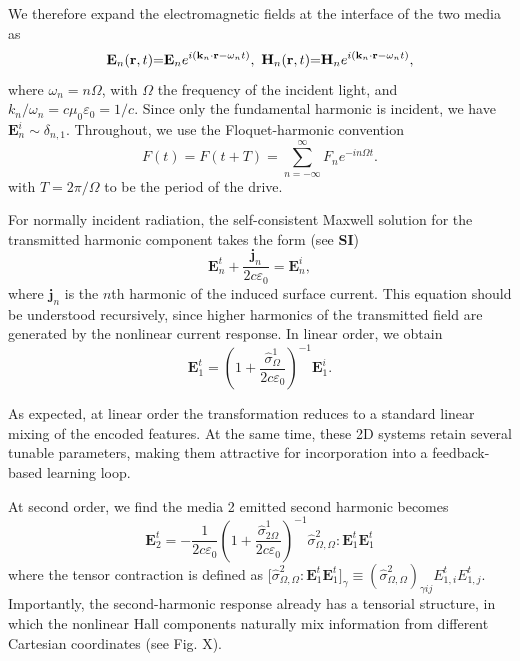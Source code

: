 \documentclass[twocolumn,aps,prb,superscriptaddress,longbibliography]{revtex4-2}
\renewcommand{\epsilon}{\varepsilon}
\begin{document}
We therefore expand the electromagnetic fields at the interface of the two media as
\begin{equation}
\mathbf E_n(\mathbf r,t)\hspace{-1mm}=\hspace{-1mm}\mathbf E_n e^{i(\mathbf k_n\cdot \mathbf r-\omega_n t)},~\mathbf H_n(\mathbf r,t)\hspace{-1mm}=\hspace{-1mm}\mathbf H_n e^{i(\mathbf k_n\cdot \mathbf r-\omega_n t)},
\end{equation}
where $\omega_n=n\Omega$, with $\Omega$ the frequency of the incident light, and $k_n/\omega_n = c\mu_0\varepsilon_0 = 1/c$. Since only the fundamental harmonic is incident, we have $\mathbf E_n^i \sim \delta_{n,1}$. Throughout, we use the Floquet-harmonic convention
\begin{equation}
F(t)=F(t+T)=\sum_{n=-\infty}^{\infty}F_n e^{-in\Omega t}.
\end{equation}
with $T = 2\pi/\Omega$ to be the period of the drive.

For normally incident radiation, the self-consistent Maxwell solution for the transmitted harmonic component takes the form (see \textbf{SI})
\begin{equation}
{\mathbf E_n^t+\frac{\mathbf j_n}{2c\epsilon_0}=\mathbf E_n^i,}
\end{equation}
where $\mathbf j_n$ is the $n$th harmonic of the induced surface current. This equation should be understood recursively, since higher harmonics of the transmitted field are generated by the nonlinear current response. In linear order, we obtain
\begin{equation}
\mathbf E_1^t=\left(1+\frac{\hat\sigma^1_{\Omega}}{2c\epsilon_0}\right)^{-1}\mathbf E_1^i.
\end{equation}

As expected, at linear order the transformation reduces to a standard linear mixing of the encoded features. At the same time, these 2D systems retain several tunable parameters, making them attractive for incorporation into a feedback-based learning loop. 

At second order, we find the media 2 emitted second harmonic becomes
\begin{equation}
{
\mathbf E_2^t=
-\frac{1}{2c\varepsilon_0}
\left(1+\frac{\hat\sigma^1_{2\Omega}}{2c\epsilon_0}\right)^{-1}
\hat\sigma^2_{\Omega,\Omega}:\mathbf E_1^t\mathbf E_1^t
}
\end{equation}
where the tensor contraction is defined as $\big[\hat\sigma^2_{\Omega,\Omega}:\mathbf E_1^t\mathbf E_1^t\big]_\gamma\equiv(\hat\sigma^2_{\Omega,\Omega})_{\gamma ij} E_{1,i}^t E_{1,j}^t.$ Importantly, the second-harmonic response already has a tensorial structure, in which the nonlinear Hall components naturally mix information from different Cartesian coordinates (see Fig. X).
\end{document}
